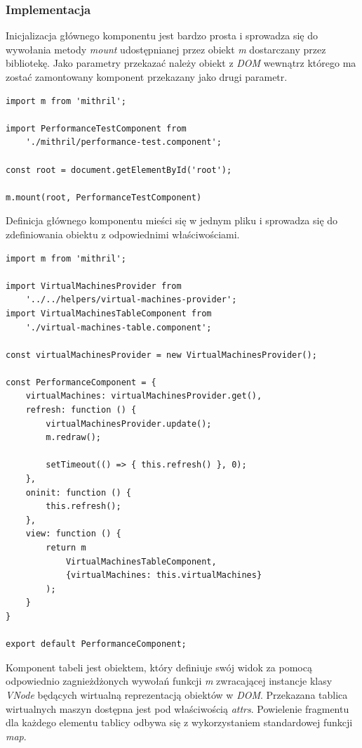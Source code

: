 \documentclass[polish, twoside, 12pt]{mwart}
\begin{document}
\subsubsection{Implementacja}

Inicjalizacja głównego komponentu jest bardzo prosta i sprowadza się do wywołania metody \emph{mount} udostępnianej przez obiekt \emph{m} dostarczany przez bibliotekę. Jako parametry przekazać należy obiekt z \emph{DOM} wewnątrz którego ma zostać zamontowany komponent przekazany jako drugi parametr.

\begin{lstlisting}[caption=Inicjalizacja głównego komponentu]
import m from 'mithril';

import PerformanceTestComponent from
    './mithril/performance-test.component';

const root = document.getElementById('root');

m.mount(root, PerformanceTestComponent)
\end{lstlisting}

Definicja głównego komponentu mieści się w jednym pliku i sprowadza się do zdefiniowania obiektu z odpowiednimi właściwościami.

\begin{lstlisting}[caption=Główny komponent]
import m from 'mithril';

import VirtualMachinesProvider from
    '../../helpers/virtual-machines-provider';
import VirtualMachinesTableComponent from
    './virtual-machines-table.component';

const virtualMachinesProvider = new VirtualMachinesProvider();

const PerformanceComponent = {
    virtualMachines: virtualMachinesProvider.get(),
    refresh: function () {
        virtualMachinesProvider.update();
        m.redraw();

        setTimeout(() => { this.refresh() }, 0);
    },
    oninit: function () {
        this.refresh();
    },
    view: function () {
        return m
            VirtualMachinesTableComponent,
            {virtualMachines: this.virtualMachines}
        );
    }
}

export default PerformanceComponent;
\end{lstlisting}

Komponent tabeli jest obiektem, który definiuje swój widok za pomocą odpowiednio zagnieżdżonych wywołań funkcji \emph{m} zwracającej instancje klasy \emph{VNode} będących wirtualną reprezentacją obiektów w \emph{DOM}. Przekazana tablica wirtualnych maszyn dostępna jest pod właściwością \emph{attrs}. Powielenie fragmentu dla każdego elementu tablicy odbywa się z wykorzystaniem standardowej funkcji \emph{map}.
\end{document}
